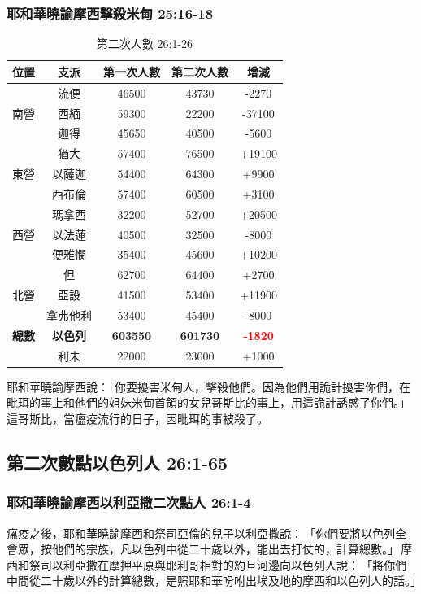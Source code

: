 \subsubsection{耶和華曉諭摩西擊殺米甸 25:16-18}
\begin{table}
\vspace*{-15mm}
\centering
\begin{tabular}{|c|c|c|c|c|}\hline\hline
位置 & 支派 & 第一次人數&第二次人數&  增減 \\ \hline\hline
\multirow{3}{*}{南營} & 流便 & 46500 & 43730  &-2270\\ \cline{2-5}
\multicolumn{1}{|c|}{}  &西緬 & 59300 & 22200 &-37100 \\\cline{2-5}
\multicolumn{1}{|c|}{}  &迦得&45650&40500&-5600\\\cline{2-5}
\hline
\multirow{3}{*}{東營} &猶大 & 57400    &76500& +19100\\\cline{2-5}
\multicolumn{1}{|c|}{} & 以薩迦& 54400&64300&+9900\\\cline{2-5}
\multicolumn{1}{|c|}{} & 西布倫&57400&60500&+3100\\\cline{2-5}
\hline
\multirow{3}{*}{西營} &瑪拿西&32200&52700&+20500\\\cline{2-5}
\multicolumn{1}{|c|}{} & 以法蓮&40500&32500&-8000\\\cline{2-5}
\multicolumn{1}{|c|}{} & 便雅憫&35400&45600&+10200 \\\cline{2-5}
\hline
\multirow{3}{*}{北營} &但&62700&64400&+2700\\\cline{2-5}
\multicolumn{1}{|c|}{} & 亞設&41500&53400&+11900\\\cline{2-5}
\multicolumn{1}{|c|}{} & 拿弗他利&53400&45400&-8000\\\cline{2-5}
\hline
\textbf{總數} & \textbf{以色列} & \textbf{603550}  & \textbf{601730} &
 \textbf{\textcolor{red}{-1820}}\\\hline
 & 利未& 22000 & 23000 & +1000\\\hline
\end{tabular}
\caption{第二次人數 26:1-26 }
\end{table}
耶和華曉諭摩西說：「你要擾害米甸人，擊殺他們。因為他們用詭計擾害你們，在毗珥的事上和他們的姐妹米甸首領的女兒哥斯比的事上，用這詭計誘惑了你們。」這哥斯比，當瘟疫流行的日子，因毗珥的事被殺了。


\subsection{第二次數點以色列人 26:1-65}
\subsubsection{耶和華曉諭摩西以利亞撒二次點人 26:1-4}
瘟疫之後，耶和華曉諭摩西和祭司亞倫的兒子以利亞撒說： 「你們要將以色列全會眾，按他們的宗族，凡以色列中從二十歲以外，能出去打仗的，計算總數。」 摩西和祭司以利亞撒在摩押平原與耶利哥相對的約旦河邊向以色列人說： 「將你們中間從二十歲以外的計算總數，是照耶和華吩咐出埃及地的摩西和以色列人的話。」

